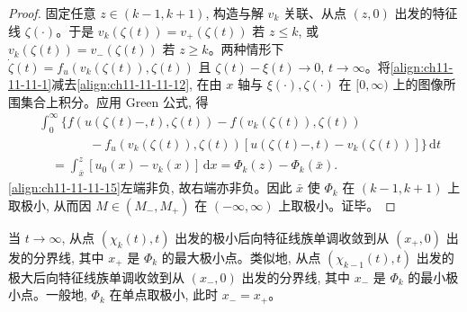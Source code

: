 \documentclass[../../main.tex]{subfiles}
\begin{document}
\begin{proof}
固定任意 $z\in(k-1,k+1)$, 构造与解 $v_k$ 关联、从点 $(z,0)$ 出发的特征线 $\zeta(\cdot)$。于是 $v_k(\zeta(t))=v_+(\zeta(t))$ 若 $z\leqslant k$, 或 $v_k(\zeta(t))=v_-(\zeta(t))$ 若 $z\geqslant k$。两种情形下 $\dot{\zeta}(t)=f_u(v_k(\zeta(t)),\zeta(t))$ 且 $\zeta(t)-\xi(t)\to0$, $t\to\infty$。将\eqref{align:ch11-11-11-1}减去\eqref{align:ch11-11-11-12}, 在由 $x$ 轴与 $\xi(\cdot),\zeta(\cdot)$ 在 $[0,\infty)$ 上的图像所围集合上积分。应用 Green 公式, 得
\begin{align}
&\int_0^\infty\bigl\{f(u(\zeta(t)-,t),\zeta(t))-f(v_k(\zeta(t)),\zeta(t))\nonumber\\
&\qquad\qquad-f_u(v_k(\zeta(t)),\zeta(t))[u(\zeta(t)-,t)-v_k(\zeta(t))]\bigr\}\,\mathrm{d}t\nonumber\\
&\quad=\int_{\bar x}^{z}[u_0(x)-v_k(x)]\,\mathrm{d}x=\Phi_k(z)-\Phi_k(\bar x).\label{align:ch11-11-11-15}
\end{align}
\eqref{align:ch11-11-11-15}左端非负, 故右端亦非负。因此 $\bar x$ 使 $\Phi_k$ 在 $(k-1,k+1)$ 上取极小, 从而因 $M\in(M_-,M_+)$ 在 $(-\infty,\infty)$ 上取极小。证毕。
\end{proof}

当 $t\to\infty$, 从点 $(\chi_k(t),t)$ 出发的极小后向特征线族单调收敛到从 $(x_+,0)$ 出发的分界线, 其中 $x_+$ 是 $\Phi_k$ 的最大极小点。类似地, 从点 $(\chi_{k-1}(t),t)$ 出发的极大后向特征线族单调收敛到从 $(x_-,0)$ 出发的分界线, 其中 $x_-$ 是 $\Phi_k$ 的最小极小点。一般地, $\Phi_k$ 在单点取极小, 此时 $x_-=x_+$。
\end{document}
